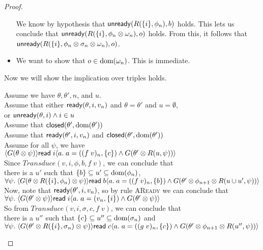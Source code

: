 \begin{proof}
\begin{itemize}
  We know by hypothesis that $\mathsf{unready}({R(\{{i}\}, \phi_n)}, {b})$
  holds. This lets us conclude that $\mathsf{unready}({R(\{{i}\}, \phi_n
    \otimes \omega_n)}, {o})$ holds. From this, it follows that
  $\mathsf{unready}({R(\{{i}\}, \phi_n \otimes \sigma_n \otimes
    \omega_n)}, {o})$.

\item We want to show that $o \in \mbox{dom}({\omega_n})$. This is immediate. 
\end{itemize}

\noindent Now we will show the implication over triples holds.

\begin{tabbedproof}
\oo Assume we have $\theta, \theta', n$, and $u$. \\
\oo Assume that either $\mathsf{ready}({\theta}, {i}, {v_n})$ and $\theta = \theta'$ and $u = \emptyset$,  \\
\oo or $\mathsf{unready}({\theta}, {i}) \land i \in u$ \\
\oo Assume that $\mathsf{closed}({\theta'}, {\mbox{dom}({\theta'})})$ \\
\oo Assume that $\mathsf{ready}({\theta'}, {i}, {v_n})$ and $\mathsf{closed}({\theta'}, {\mbox{dom}({\theta'})})$ \\
\oo Assume for all $\psi$, we have \\
\ox  $\langle{G(\theta \otimes \psi)}\rangle{\mathsf{read}\;i}\langle{a}.\;{a = ((f\;v)_n, \{{c}\}) 
      \land G(\theta' \otimes R(u,\psi)) }\rangle$ \\
\oo Since $\mathit{Transduce}(v, i, \phi, b, f\;v)$, we can conclude that \\
\oo there is a $u'$ such that $\{{b}\} \subseteq u' \subseteq \mbox{dom}({\phi_n})$, \\
\oo $\forall \psi.\;\langle{G(\theta \otimes R(\{{i}\},\phi_n) \otimes \psi)}\rangle{\mathsf{read}\;b}\langle{a}.\;{a = ((f\;v)_n, \{{b}\}) \land G(\theta' \otimes \phi_{n+1} \otimes R(u \cup u', \psi))}\rangle$ \\
\oo Now, note that $\mathsf{ready}({\theta'}, {i}, {v_n})$, so by rule \textsc{AReady} we can conclude that \\
\oo $\forall \psi.\;\langle{G(\theta' \otimes \psi)}\rangle{\mathsf{read}\;i}\langle{a}.\;{a = (v_n, \{{i}\}) \land G(\theta' \otimes \psi)}\rangle$ \\
\oo So from $\mathit{Transduce}(v, i, \sigma, c, f\;v)$, we can conclude that\\
\oo there is a $u''$ such that $\{{c}\} \subseteq u'' \subseteq \mbox{dom}({\sigma_n})$ and \\
\oo $\forall \psi.\;\langle{G(\theta' \otimes R(\{{i}\},\sigma_n) \otimes \psi)}\rangle{\mathsf{read}\;c}\langle{a}.\;{a = ((g\;v)_n, \{{c}\}) \land G(\theta' \otimes \phi_{n+1} \otimes R(u'', \psi))}\rangle$ \\

\end{tabbedproof}
\end{proof}

